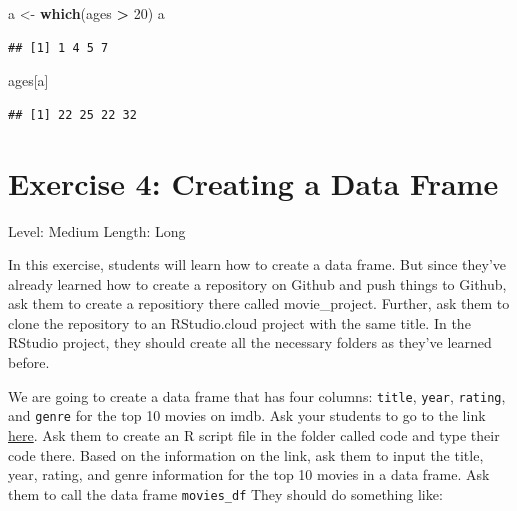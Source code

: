 \documentclass[]{book}
\newenvironment{Shaded}{\begin{snugshade}}{\end{snugshade}}
\newcommand{\DecValTok}[1]{\textcolor[rgb]{0.00,0.00,0.81}{#1}}
\newcommand{\KeywordTok}[1]{\textcolor[rgb]{0.13,0.29,0.53}{\textbf{#1}}}
\newcommand{\NormalTok}[1]{#1}
\newcommand{\OperatorTok}[1]{\textcolor[rgb]{0.81,0.36,0.00}{\textbf{#1}}}
\newcommand{\StringTok}[1]{\textcolor[rgb]{0.31,0.60,0.02}{#1}}
\begin{document}
\begin{Shaded}
\begin{Highlighting}[]
\NormalTok{a <-}\StringTok{ }\KeywordTok{which}\NormalTok{(ages }\OperatorTok{>}\StringTok{ }\DecValTok{20}\NormalTok{)}
\NormalTok{a}
\end{Highlighting}
\end{Shaded}

\begin{verbatim}
## [1] 1 4 5 7
\end{verbatim}

\begin{Shaded}
\begin{Highlighting}[]
\NormalTok{ages[a]}
\end{Highlighting}
\end{Shaded}

\begin{verbatim}
## [1] 22 25 22 32
\end{verbatim}

\hypertarget{exercise-4-creating-a-data-frame}{%
\section*{Exercise 4: Creating a Data Frame}\label{exercise-4-creating-a-data-frame}}

Level: Medium
Length: Long

In this exercise, students will learn how to create a data frame. But since they've already learned how to create a repository on Github and push things to Github, ask them to create a repositiory there called movie\_project. Further, ask them to clone the repository to an RStudio.cloud project with the same title. In the RStudio project, they should create all the necessary folders as they've learned before.

We are going to create a data frame that has four columns: \texttt{title}, \texttt{year}, \texttt{rating}, and \texttt{genre} for the top 10 movies on imdb. Ask your students to go to the link \href{https://www.imdb.com/search/title?genres=drama\&groups=top_250\&sort=user_rating}{here}. Ask them to create an R script file in the folder called code and type their code there. Based on the information on the link, ask them to input the title, year, rating, and genre information for the top 10 movies in a data frame. Ask them to call the data frame \texttt{movies\_df} They should do something like:
\end{document}

